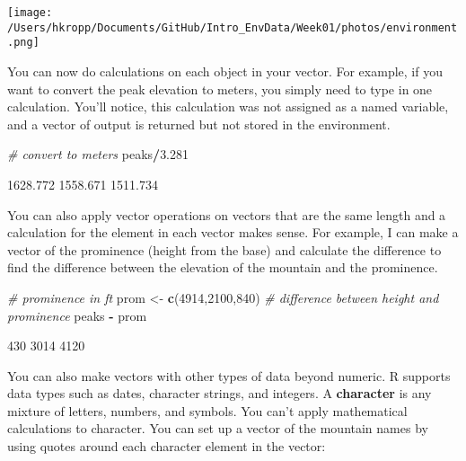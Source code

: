 \documentclass[
]{book}
\newenvironment{Shaded}{\begin{snugshade}}{\end{snugshade}}
\newcommand{\CommentTok}[1]{\textcolor[rgb]{0.56,0.35,0.01}{\textit{#1}}}
\newcommand{\DecValTok}[1]{\textcolor[rgb]{0.00,0.00,0.81}{#1}}
\newcommand{\FloatTok}[1]{\textcolor[rgb]{0.00,0.00,0.81}{#1}}
\newcommand{\FunctionTok}[1]{\textcolor[rgb]{0.13,0.29,0.53}{\textbf{#1}}}
\newcommand{\NormalTok}[1]{#1}
\newcommand{\OtherTok}[1]{\textcolor[rgb]{0.56,0.35,0.01}{#1}}
\newcommand{\SpecialCharTok}[1]{\textcolor[rgb]{0.81,0.36,0.00}{\textbf{#1}}}
\theoremstyle{definition}
\theoremstyle{definition}
\theoremstyle{definition}
\theoremstyle{definition}
\theoremstyle{remark}
\begin{document}
\texttt{[image: /Users/hkropp/Documents/GitHub/Intro\_EnvData/Week01/photos/environment.png]}

You can now do calculations on each object in your vector. For example, if you want to convert the peak elevation to meters, you simply need to type in one calculation. You'll notice, this calculation was not assigned as a named variable, and a vector of output is returned but not stored in the environment.

\begin{Shaded}
\begin{Highlighting}[]
\CommentTok{\# convert to meters}
\NormalTok{peaks}\SpecialCharTok{/}\FloatTok{3.281}
\end{Highlighting}
\end{Shaded}

\begin{Shaded}
\begin{Highlighting}[]
\NormalTok{[1] 1628.772 1558.671 1511.734}
\end{Highlighting}
\end{Shaded}

You can also apply vector operations on vectors that are the same length and a calculation for the element in each vector makes sense. For example, I can make a vector of the prominence (height from the base) and calculate the difference to find the difference between the elevation of the mountain and the prominence.

\begin{Shaded}
\begin{Highlighting}[]
\CommentTok{\# prominence in ft}
\NormalTok{prom }\OtherTok{\textless{}{-}} \FunctionTok{c}\NormalTok{(}\DecValTok{4914}\NormalTok{,}\DecValTok{2100}\NormalTok{,}\DecValTok{840}\NormalTok{)}
\CommentTok{\# difference between height and prominence}
\NormalTok{peaks }\SpecialCharTok{{-}}\NormalTok{ prom}
\end{Highlighting}
\end{Shaded}

\begin{Shaded}
\begin{Highlighting}[]
\NormalTok{[1]  430 3014 4120}
\end{Highlighting}
\end{Shaded}

You can also make vectors with other types of data beyond numeric. R supports data types such as dates, character strings, and integers. A \textbf{character} is any mixture of letters, numbers, and symbols. You can't apply mathematical calculations to character. You can set up a vector of the mountain names by using quotes around each character element in the vector:
\end{document}
